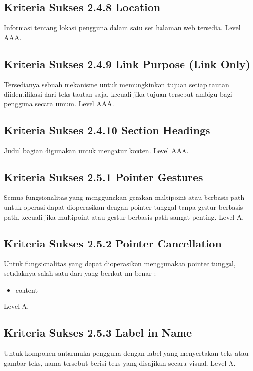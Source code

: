 \subsection{Kriteria Sukses 2.4.8 Location}
\label{sec:kriteria_2.4.8}
Informasi tentang lokasi pengguna dalam satu set halaman web tersedia.
Level AAA.

\subsection{Kriteria Sukses 2.4.9 Link Purpose (Link Only)}
\label{sec:kriteria_2.4.9}
Tersedianya sebuah mekanisme untuk memungkinkan tujuan setiap tautan diidentifikasi dari teks tautan saja, kecuali jika tujuan tersebut ambigu bagi pengguna secara umum.
Level AAA.

\subsection{Kriteria Sukses 2.4.10 Section Headings}
\label{sec:kriteria_2.4.10}
Judul bagian digunakan untuk mengatur konten.
Level AAA.

\subsection{Kriteria Sukses 2.5.1 Pointer Gestures}
\label{sec:kriteria_2.5.1}
Semua fungsionalitas yang menggunakan gerakan multipoint atau berbasis path untuk operasi dapat dioperasikan dengan pointer tunggal tanpa gestur berbasis path, kecuali jika multipoint atau gestur berbasis path sangat penting.
Level A.

\subsection{Kriteria Sukses 2.5.2 Pointer Cancellation}
\label{sec:kriteria_2.5.2}
Untuk fungsionalitas yang dapat dioperasikan menggunakan pointer tunggal, setidaknya salah satu dari yang berikut ini benar :

\begin{itemize}
	\item content
\end{itemize}

Level A.

\subsection{Kriteria Sukses 2.5.3 Label in Name}
\label{sec:kriteria_2.5.3}
Untuk komponen antarmuka pengguna dengan label yang menyertakan teks atau gambar teks, nama tersebut berisi teks yang disajikan secara visual.
Level A.

